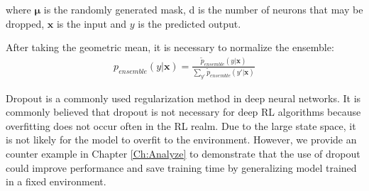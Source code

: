 where $\boldsymbol{\mu}$ is the randomly generated mask, d is the number of neurons that may be dropped, $\boldsymbol{x}$ is the input and $y$ is the predicted output.
\par
After taking the geometric mean, it is necessary to normalize the ensemble:
\begin{align}
p_{ensemble}(y | \boldsymbol{x})=\frac{\tilde{p}_{ensemble}(y | \boldsymbol{x})}{\sum_{y'} \tilde{p}_{ensemble}(y' | \boldsymbol{x})}
\end{align}

Dropout is a commonly used regularization method in deep neural networks. It is commonly believed that dropout is not necessary for deep RL algorithms because overfitting does not occur often in the RL realm. Due to the large state space, it is not likely for the model to overfit to the environment. However, we provide an counter example in Chapter \ref{Ch:Analyze} to demonstrate that the use of dropout could improve performance and save training time by generalizing model trained in a fixed environment.


\endinput

